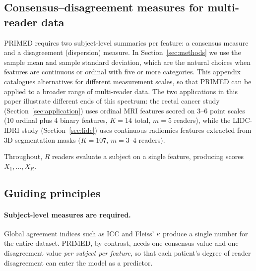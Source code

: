 \documentclass[referee,lineno,pdflatex,sn-vancouver-num]{sn-jnl}
\begin{document}
\begin{appendices}

\section{Consensus--disagreement measures for multi-reader data}\label{secA1}

PRIMED requires two subject-level summaries per feature: a consensus measure and a disagreement (dispersion) measure.
In Section~\ref{sec:methods} we use the sample mean and sample standard deviation, which are the natural choices when features are continuous or ordinal with five or more categories.
This appendix catalogues alternatives for different measurement scales, so that PRIMED can be applied to a broader range of multi-reader data.
The two applications in this paper illustrate different ends of this spectrum: the rectal cancer study (Section~\ref{sec:application}) uses ordinal MRI features scored on 3--6 point scales (10 ordinal plus 4 binary features, $K = 14$ total, $m = 5$ readers), while the LIDC-IDRI study (Section~\ref{sec:lidc}) uses continuous radiomics features extracted from 3D segmentation masks ($K = 107$, $m = 3$--$4$ readers).

Throughout, $R$ readers evaluate a subject on a single feature, producing scores $X_1, \dots, X_R$.

\subsection{Guiding principles}\label{secA1:principles}

\paragraph{Subject-level measures are required.}
Global agreement indices such as ICC \cite{Shrout1979} and Fleiss' $\kappa$ \cite{Fleiss1971} produce a single number for the entire dataset.
PRIMED, by contrast, needs one consensus value and one disagreement value \emph{per subject per feature}, so that each patient's degree of reader disagreement can enter the model as a predictor.


\end{appendices}
\end{document}
